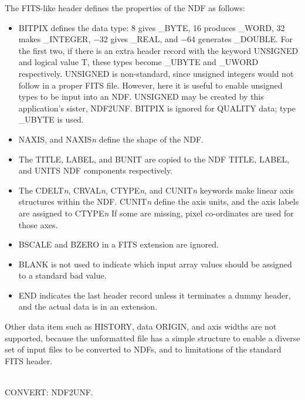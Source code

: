 \documentclass[twoside,11pt]{article}
\newcommand{\htmlref}[2]{#1}
\newcommand{\xref}[3]{#1}
\newcommand{\CONVERT}{{\footnotesize CONVERT}}
\newcommand{\sstdiytopic}[2]{\goodbreak \item[{\hspace{-0.35em}#1\hspace{-0.35em}:}] \mbox{} \\[1.3ex] #2}
\newcommand{\sstitem}{\item}
\newcommand{\sstdiytopic}[2]{\\ \item[{#1}:]
      \begin{description}
         #2
      \end{description}
   }
\newcommand{\sstitem}{\item}
\begin{document}
{{{         \sstitem
            The FITS-like header defines the properties of the NDF as
            follows:
            \begin{itemize}
            \item BITPIX defines the data type: 8 gives \_BYTE, 16 produces
            \_WORD, 32 makes \_INTEGER, $-$32 gives \_REAL, and $-$64 generates
            \_DOUBLE.  For the first two, if there is an extra header
            record with the keyword UNSIGNED and logical value T, these
            types become \_UBYTE and \_UWORD respectively.  UNSIGNED is
            non-standard, since unsigned integers would not follow in a
            proper FITS file.  However, here it is useful to enable
            unsigned types to be input into an NDF.  UNSIGNED may be
            created by this application's sister, NDF2UNF.  BITPIX is
            ignored for QUALITY data; type \_UBYTE is used.
            \item NAXIS, and NAXIS{\em{n}} define the shape of the NDF.
            \item The TITLE, LABEL, and BUNIT are copied to the NDF
            TITLE, LABEL, and UNITS NDF components respectively.
            \item The CDELT{\em{n}}, CRVAL{\em{n}}, CTYPE{\em{n}}, and CUNIT{\em{n}} keywords make
            linear axis structures within the NDF.  CUNIT{\em{n}} define the
            axis units, and the axis labels are assigned to CTYPE{\em{n}} If
            some are missing, pixel co-ordinates are used for those
            axes.
            \item BSCALE and BZERO in a FITS extension are ignored.
            \item BLANK is not used to indicate which input array values
            should be assigned to a \xref{standard bad
            value}{sun95}{se_badmasking}.
            \item END indicates the last header record unless it
            terminates a dummy header, and the actual data is in an
            extension.
            \end{itemize}

         \sstitem
            Other data item such as HISTORY, data ORIGIN, and axis
            widths are not supported, because the unformatted file has a
            simple structure to enable a diverse set of input files to be
            converted to NDFs, and to limitations of the standard FITS
            header.
      }
   }
   \sstdiytopic{
      Related Applications
   }{
      \CONVERT: \htmlref{NDF2UNF}{NDF2UNF}.
   }
}
\end{document}
